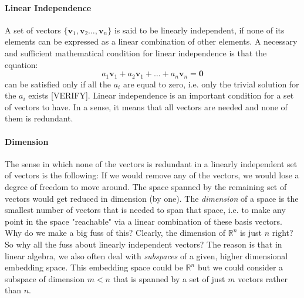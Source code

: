 \paragraph{Linear Independence}
A set of vectors $\{\mathbf{v}_1, \mathbf{v}_2 \ldots, \mathbf{v}_n \}$ is said to be linearly independent, if none of its elements can be expressed as a linear combination of other elements. A necessary and sufficient mathematical condition for linear independence is that the equation:
\begin{equation}
 a_1 \mathbf{v}_1 + a_2 \mathbf{v}_1  + \ldots + a_n \mathbf{v}_n = \mathbf{0}
\end{equation}
can be satisfied only if all the $a_i$ are equal to zero, i.e. only the trivial solution for the $a_i$ exists [VERIFY]. Linear independence is an important condition for a set of vectors to have. In a sense, it means that all vectors are needed and none of them is redundant. 

\paragraph{Dimension}
The sense in which none of the vectors is redundant in a linearly independent set of vectors is the following: If we would remove any of the vectors, we would lose a degree of freedom to move around. The space spanned by the remaining set of vectors would get reduced in dimension (by one). The \emph{dimension} of a space is the smallest number of vectors that is needed to span that space, i.e. to make any point in the space "reachable" via a linear combination of these basis vectors. Why do we make a big fuss of this? Clearly, the dimension of $\mathbb{R}^n$ is just $n$ right? So why all the fuss about linearly independent vectors? The reason is that in linear algebra, we also often deal with \emph{subspaces} of a given, higher dimensional embedding space. This embedding space could be $\mathbb{R}^n$ but we could consider a subspace of dimension $m < n$ that is spanned by a set of just $m$ vectors rather than $n$.


